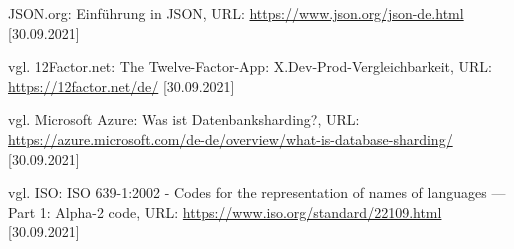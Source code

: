 \begin{thebibliography}{2}
         JSON.org: Einführung in JSON, URL: \url{https://www.json.org/json-de.html} [30.09.2021]

         vgl. 12Factor.net: The Twelve-Factor-App: X.Dev-Prod-Vergleichbarkeit, URL: \url{https://12factor.net/de/} [30.09.2021]

         vgl. Microsoft Azure: Was ist Datenbanksharding?, URL: \url{https://azure.microsoft.com/de-de/overview/what-is-database-sharding/} [30.09.2021]

         vgl. ISO: ISO 639-1:2002 - Codes for the representation of names of languages — Part 1: Alpha-2 code, URL: \url{https://www.iso.org/standard/22109.html} [30.09.2021]

\end{thebibliography}
